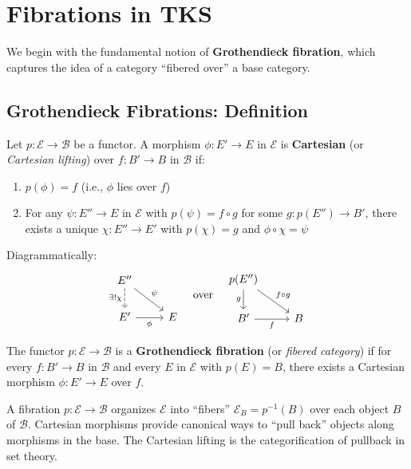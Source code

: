 \section{Fibrations in TKS}
\label{sec:fibrations-tks}

We begin with the fundamental notion of \textbf{Grothendieck fibration}, which
captures the idea of a category ``fibered over'' a base category.

\subsection{Grothendieck Fibrations: Definition}
\label{subsec:grothendieck-fibrations}

\begin{definition}
\label{def:grothendieck-fibration}
Let $p : \mathcal{E} \to \mathcal{B}$ be a functor. A morphism $\phi : E' \to E$
in $\mathcal{E}$ is \textbf{Cartesian} (or \emph{Cartesian lifting}) over
$f : B' \to B$ in $\mathcal{B}$ if:
\begin{enumerate}
  \item $p(\phi) = f$ (i.e., $\phi$ lies over $f$)
  \item For any $\psi : E'' \to E$ in $\mathcal{E}$ with $p(\psi) = f \circ g$
        for some $g : p(E'') \to B'$, there exists a unique $\chi : E'' \to E'$
        with $p(\chi) = g$ and $\phi \circ \chi = \psi$
\end{enumerate}
Diagrammatically:
\[
\begin{tikzcd}
  E'' \arrow[dr, "\psi"] \arrow[d, dashed, "\exists! \chi"'] & \\
  E' \arrow[r, "\phi"'] & E
\end{tikzcd}
\quad \text{over} \quad
\begin{tikzcd}
  p(E'') \arrow[dr, "f \circ g"] \arrow[d, "g"'] & \\
  B' \arrow[r, "f"'] & B
\end{tikzcd}
\]

The functor $p : \mathcal{E} \to \mathcal{B}$ is a \textbf{Grothendieck fibration}
(or \emph{fibered category}) if for every $f : B' \to B$ in $\mathcal{B}$ and
every $E$ in $\mathcal{E}$ with $p(E) = B$, there exists a Cartesian morphism
$\phi : E' \to E$ over $f$.
\end{definition}

\begin{remark}[Intuition]
A fibration $p : \mathcal{E} \to \mathcal{B}$ organizes $\mathcal{E}$ into
``fibers'' $\mathcal{E}_B = p^{-1}(B)$ over each object $B$ of $\mathcal{B}$.
Cartesian morphisms provide canonical ways to ``pull back'' objects along
morphisms in the base. The Cartesian lifting is the categorification of
pullback in set theory.
\end{remark}

